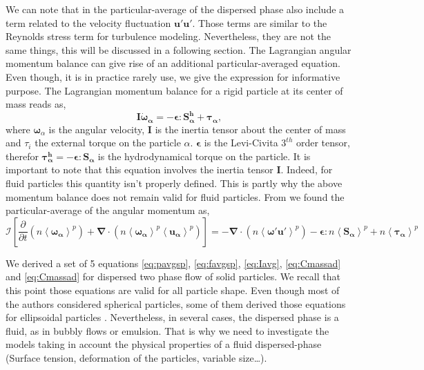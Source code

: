 We can note that in the particular-average of the dispersed phase also include a term related to the velocity fluctuation $\bm{u'u'}$. 
Those terms are similar to the Reynolds stress term for turbulence modeling.
Nevertheless, they are not the same things, this will be discussed in a following section. 
The Lagrangian angular momentum balance can give rise of an additional particular-averaged equation. 
Even though, it is in practice rarely use, we give the expression for informative purpose.
The Lagrangian momentum balance for a rigid particle at its center of mass reads as,
\begin{equation}
    \mathcal{\bm{I}}\bm{\dot{\omega}_\alpha} = - \bm{\epsilon} : \bm{S^h_\alpha} + \bm{\tau_\alpha},
    \label{eq:newtion2law2}
\end{equation}
where $\bm{\omega}_\alpha$ is the angular velocity, $\mathcal{\bm{I}}$ is the inertia tensor about the center of mass and $\tau_i$ the external torque on the particle $\alpha$. 
$\bm{\epsilon}$ is the Levi-Civita $3^{th}$ order tensor, therefor $\bm{\tau^h_\alpha} = - \bm{\epsilon} : \bm{S_\alpha}$ is the hydrodynamical torque on the particle.  
It is important to note that this equation involves the inertia tensor $\mathcal{\bm{I}}$.
Indeed, for fluid particles this quantity isn't properly defined.
This is partly why the above momentum balance does not remain valid for fluid particles.
From \citet{jackson1997locally} we found the particular-average of the angular momentum as,
\begin{equation}
    \bm{\mathcal{I}} \left[\frac{\partial}{\partial t}(n\left<\bm{\omega_\alpha}\right>^p)+\bm{\nabla}\cdot(n\left<\bm{\omega_\alpha }\right>^p\left<\bm{u_\alpha}\right>^p)\right] = -\bm{\nabla}\cdot(n\left<\bm{\omega'u'}\right>^p) - \bm{\epsilon} : n\left<\bm{S_\alpha}\right>^p + n\left<\bm{\tau_\alpha}\right>^p
    \label{eq:Iavg}
\end{equation}




We derived a set of 5 equations \ref{eq:pavgsp}, \ref{eq:favgsp}, \ref{eq:Iavg}, \ref{eq:Cmassad} and \ref{eq:Cmassad} for dispersed two phase flow of solid particles. 
We recall that this point those equations are valid for all particle shape. 
Even though most of the authors considered spherical particles, some of them derived those equations for ellipsoidal particles \citep{batchelor1970stress}.
Nevertheless, in several cases, the dispersed phase is  a fluid, as in bubbly flows or emulsion. 
That is why we need to investigate the models taking in account the physical properties of a fluid dispersed-phase (Surface tension, deformation of the particles, variable size\ldots).

